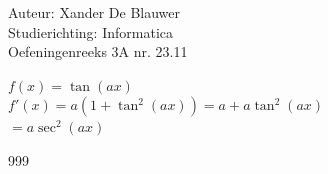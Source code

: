 \documentclass[a4paper]{article}
\begin{document}
\noindent \large Auteur: Xander De Blauwer \\
\noindent \large Studierichting: Informatica\\
\noindent \large Oefeningenreeks 3A nr. 23.11 \\

\medskip

\normalsize

$f(x) = \tan(ax)$ \\

$f'(x) = a(1+\tan^2(ax)) = a + a\tan^2(ax)$ \\

$ = a\sec^2(ax)$ \\ 





\begin{thebibliography}{999}
\end{thebibliography}
\end{document}

